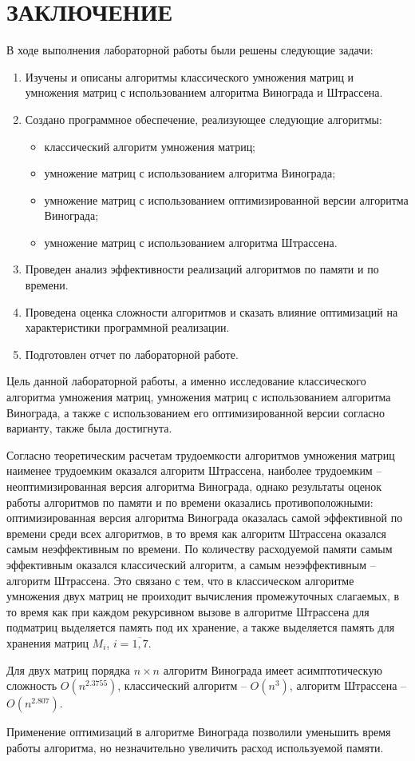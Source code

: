 \chapter*{ЗАКЛЮЧЕНИЕ}

В ходе выполнения лабораторной работы были решены следующие задачи:

\begin{enumerate}[label={\arabic*)}]
	\item Изучены и описаны алгоритмы классического умножения матриц и умножения матриц с использованием алгоритма Винограда и Штрассена.
	\item Создано программное обеспечение, реализующее следующие алгоритмы:
	\begin{itemize}[label=--]
		\item классический алгоритм умножения матриц;
		\item умножение матриц с использованием алгоритма Винограда;
		\item умножение матриц с использованием оптимизированной версии алгоритма Винограда;
		\item умножение матриц с использованием алгоритма Штрассена.
	\end{itemize}
	
	\item Проведен анализ эффективности реализаций алгоритмов по памяти и по времени.
	\item Проведена оценка сложности алгоритмов и сказать влияние оптимизаций на характеристики программной реализации.
	\item Подготовлен отчет по лабораторной работе.
\end{enumerate}

Цель данной лабораторной работы, а именно исследование классического алгоритма умножения матриц, умножения матриц с использованием алгоритма Винограда, а также с использованием его оптимизированной версии согласно варианту, также была достигнута.

Согласно теоретическим расчетам трудоемкости алгоритмов умножения матриц наименее трудоемким оказался алгоритм Штрассена, наиболее трудоемким -- неоптимизированная версия алгоритма Винограда, однако результаты оценок работы алгоритмов по памяти и по времени оказались противоположными: оптимизированная версия алгоритма Винограда оказалась самой эффективной по времени среди всех алгоритмов, в то время как алгоритм Штрассена оказался самым неэффективным по времени. По количеству расходуемой памяти самым эффективным оказался классический алгоритм, а самым неээффективным -- алгоритм Штрассена. Это связано с тем, что в классическом алгоритме умножения двух матриц не проиходит вычисления промежуточных слагаемых, в то время как при каждом рекурсивном вызове в алгоритме Штрассена для подматриц выделяется память под их хранение, а также выделяется память для хранения матриц $M_i$, $i = \overline{1, 7}$.

Для двух матриц порядка $n \times n$ алгоритм Винограда имеет асимптотическую сложность $O(n^{2.3755})$, классический алгоритм -- $O(n^3)$, алгоритм Штрассена -- $O(n^{2.807})$.

Применение оптимизаций в алгоритме Винограда позволили уменьшить время работы алгоритма, но незначительно увеличить расход используемой памяти.
